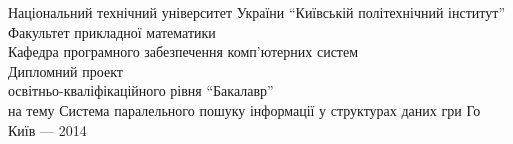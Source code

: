\begin{titlepage}
	\begin{center}
		Національний технічний університет України ``Київській політехнічний інститут''\\
		Факультет прикладної математики\\
		Кафедра програмного забезпечення комп'ютерних систем\\
		Дипломний проект\\
		освітньо-кваліфікаційного рівня ``Бакалавр''\\
		на тему
		Система паралельного пошуку інформації у структурах даних гри Го\\
		\vfill
		Київ --- 2014
	\end{center}
\end{titlepage}
